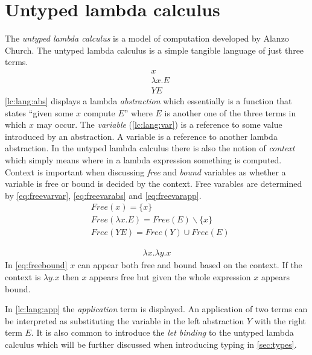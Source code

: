 \documentclass[11pt,oneside,a4paper]{report}
\begin{document}
\clearpage
\section{Untyped lambda calculus}\label{sec:lc}
The \textit{untyped lambda calculus} is a model of computation developed by Alanzo Church\cite{church1936unsolvable}.
The untyped lambda calculus is a simple tangible language of just three terms.
\begin{align}
  &x
  \label{lc:lang:var}\\
  &\lambda x . E
  \label{lc:lang:abs}\\
  &Y E
  \label{lc:lang:app}
\end{align}
\autoref{lc:lang:abs} displays a lambda \textit{abstraction} which essentially is a function that states ``given some $x$ compute $E$'' where $E$ is another one of the three terms in which $x$ may occur.
The \textit{variable} (\autoref{lc:lang:var}) is a reference to some value introduced by an abstraction.
A variable is a reference to another lambda abstraction.
In the untyped lambda calculus there is also the notion of \textit{context} which simply means where in a lambda expression something is computed.
Context is important when discussing \textit{free} and \textit{bound} variables as whether a variable is free or bound is decided by the context.
Free varables are determined by \autoref{eq:freevarvar}, \autoref{eq:freevarabs} and \autoref{eq:freevarapp}.
\begin{align}
    \label{eq:freevarvar}
    &Free(x) = \{ x \}\\
    \label{eq:freevarabs}
    &Free(\lambda x . E) = Free(E) \backslash \{ x \}\\
    \label{eq:freevarapp}
    &Free(Y E) = Free(Y) \cup Free(E)
\end{align}
\begin{exmp}
    \begin{align}
        \lambda x . \lambda y . x\label{eq:freebound}
    \end{align}
    In \autoref{eq:freebound} $x$ can appear both free and bound based on the context.
    If the context is $\lambda y . x$ then $x$ appears free but given the whole expression $x$ appears bound.
\end{exmp}

In \autoref{lc:lang:app} the \textit{application} term is displayed.
An application of two terms can be interpreted as substituting the variable in the left abstraction $Y$ with the right term $E$.
It is also common to introduce the \textit{let binding} to the untyped lambda calculus which will be further discussed when introducing typing in \autoref{sec:types}.
\end{document}
